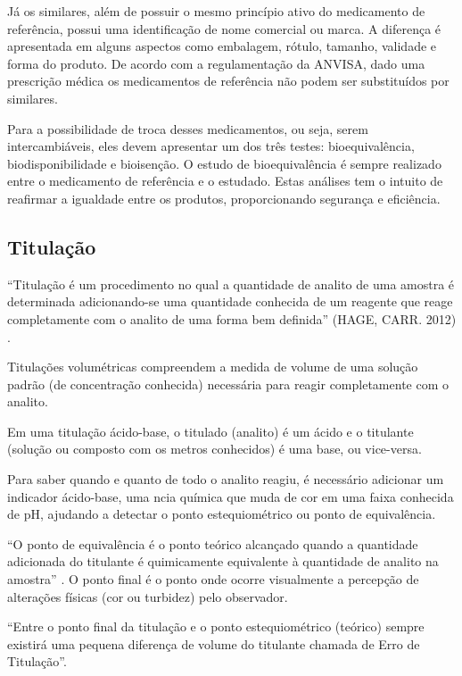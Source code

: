 Já os similares, além de possuir o mesmo princípio ativo do medicamento de referência, possui uma
identificação de nome comercial ou marca. A diferença é apresentada em alguns aspectos como embalagem,
rótulo, tamanho, validade e forma do produto. De acordo com a regulamentação da ANVISA, dado uma
prescrição médica os medicamentos de referência não podem ser substituídos por similares.

Para a possibilidade de troca desses medicamentos, ou seja, serem intercambiáveis, eles devem apresentar
um dos três testes: bioequivalência, biodisponibilidade e bioisenção. O estudo de bioequivalência é
sempre realizado entre o medicamento de referência e o estudado. Estas análises tem o intuito de
reafirmar a igualdade entre os produtos, proporcionando segurança e eficiência. \cite{ache2015}

\subsection{Titulação}\label{titulacao}

``Titulação é um procedimento no qual a quantidade de analito de uma amostra é determinada
adicionando-se uma quantidade conhecida de um reagente que reage completamente com o analito de
uma forma bem definida'' (HAGE, CARR. 2012) \cite{Hage2012}.

Titulações volumétricas compreendem a medida de volume de uma solução padrão (de concentração
conhecida) necessária para reagir completamente com o analito. \cite{Skoog2014}

Em uma titulação ácido-base, o titulado (analito) é um ácido e o titulante (solução ou composto com
os metros conhecidos) é uma base, ou vice-versa.

Para saber quando e quanto de todo o analito reagiu, é necessário adicionar um indicador ácido-base,
uma ncia química que muda de cor em uma faixa conhecida de pH, ajudando a detectar o ponto
estequiométrico ou ponto de equivalência.

``O ponto de equivalência é o ponto teórico alcançado quando a quantidade adicionada do titulante é
quimicamente equivalente à quantidade de analito na amostra'' \cite{Skoog2014}. O ponto final é o
ponto onde ocorre visualmente a percepção de alterações físicas (cor ou turbidez) pelo observador.

“Entre o ponto final da titulação e o ponto estequiométrico (teórico) sempre existirá uma pequena
diferença de volume do titulante chamada de Erro de Titulação”. \cite{Ruy1999}

